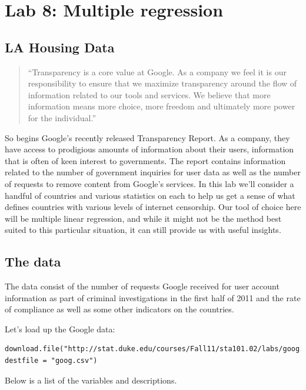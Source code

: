 \documentclass[11pt]{article}
\begin{document}
\section*{Lab 8: Multiple regression}

\subsection*{LA Housing Data}
\begin{quote}
``Transparency is a core value at Google. As a company we feel it is our responsibility to ensure that we maximize transparency around the flow of information related to our tools and services. We believe that more information means more choice, more freedom and ultimately more power for the individual.''
\end{quote}

So begins Google's recently released Transparency Report.  As a company, they have access to prodigious amounts of information about their users, information that is often of keen interest to governments.  The report contains information related to the number of government inquiries for user data as well as the number of requests to remove content from Google's services. In this lab we'll consider a handful of countries and various statistics on each to help us get a sense of what defines countries with various levels of internet censorship.  Our tool of choice here will be multiple linear regression, and while it might not be the method best suited to this particular situation, it can still provide us with useful insights.

\subsection*{The data}

The data consist of the number of requests Google received for user account information as part of criminal investigations in the first half of 2011 and the rate of compliance as well as some other indicators on the countries.

Let's load up the Google data:

\begin{lstlisting}
download.file("http://stat.duke.edu/courses/Fall11/sta101.02/labs/goog.csv", destfile = "goog.csv")
\end{lstlisting}

Below is a list of the variables and descriptions.
\end{document}
